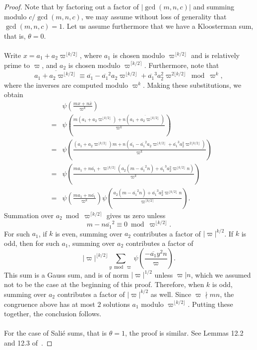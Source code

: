 \documentclass[10pt]{amsart}
\theoremstyle{plain}
\theoremstyle{plain}
\theoremstyle{remark}
\theoremstyle{definition}
\begin{document}
\begin{proof}
Note that by factoring out a factor of $|\gcd(m,n,c)|$ and summing modulo $c/\gcd(m,n,c)$, we may assume without loss of generality that $\gcd(m,n,c)=1$. Let us assume furthermore that we have a Kloosterman sum, that is, $\theta=0$.\\
\\
Write $x=a_1+a_2\varpi^{\lfloor k/2\rfloor}$, where $a_1$ is chosen modulo $\varpi^{\lfloor k/2\rfloor}$ and is relatively prime to $\varpi$, and $a_2$ is chosen modulo $\varpi^{\lceil k/2\rceil}$. Furthermore, note that
\[\overline{a_1+a_2\varpi^{\lfloor k/2\rfloor}}\equiv \overline{a_1}-\overline{a_1}^2a_2\varpi^{\lfloor k/2\rfloor}+\overline{a_1}^3a_2^2\varpi^{2\lfloor k/2\rfloor}\bmod\varpi^{k},\]
where the inverses are computed modulo $\varpi^k$. Making these substitutions, we obtain 
\begin{eqnarray*}
&&\psi\left(\frac{mx+n\overline{x}}{\varpi^k}\right)\\&=&\psi\left(\frac{m(a_1+a_2\varpi^{\lfloor k/2\rfloor})+n(\overline{a_1+a_2\varpi^{\lfloor k/2\rfloor}})}{\varpi^k}\right)\\ &=& \psi\left(\frac{(a_1+a_2\varpi^{\lfloor k/2\rfloor})m+n(\overline{a_1}-\overline{a_1}^2a_2\varpi^{\lfloor k/2\rfloor}+\overline{a_1}^3a_2^2\varpi^{2\lfloor k/2\rfloor})}{\varpi^k}\right)\\ &=& \psi\left(\frac{ma_1+n\overline{a_1}+\varpi^{\lfloor k/2\rfloor}\left(a_2\left(m-\overline{a_1}^2n\right)+\overline{a_1}^3a_2^2\varpi^{\lfloor k/2\rfloor}n\right)}{\varpi^k}\right)\\ &=& \psi\left(\frac{ma_1+n\overline{a_1}}{\varpi^k}\right)\psi\left(\frac{a_2\left(m-\overline{a_1}^2n\right)+\overline{a_1}^3a_2^2\varpi^{\lfloor k/2\rfloor}n}{\varpi^{\lceil k/2\rceil}}\right).
\end{eqnarray*}
Summation over $a_2\bmod\varpi^{\lceil k/2\rceil}$ gives us zero unless
\[m-n\overline{a_1}^2\equiv 0\bmod \varpi^{\lfloor k/2\rfloor}.\]
For such $a_1$, if $k$ is even, summing over $a_2$ contributes a factor of $|\varpi|^{k/2}$. If $k$ is odd, then for such $a_1$, summing over $a_2$ contributes a factor of
\[|\varpi|^{\lfloor k/2\rfloor}\sum_{y\bmod \varpi}\psi\left(\frac{-\overline{a_1}y^2n}{\varpi}\right).\]
This sum is a Gauss sum, and is of norm $|\varpi|^{1/2}$ unless $\varpi|n$, which we assumed not to be the case at the beginning of this proof. Therefore, when $k$ is odd, summing over $a_2$ contributes a factor of $|\varpi|^{k/2}$ as well. Since $\varpi\nmid mn$, the congruence above has at most $2$ solutions $a_1$ modulo $\varpi^{\lfloor k/2\rfloor}$. Putting these together, the conclusion follows.\\
\\
For the case of Sali\'e sums, that is $\theta=1$, the proof is similar. See Lemmas 12.2 and 12.3 of~\cite{MR2061214}.
\end{proof}
\end{document}
